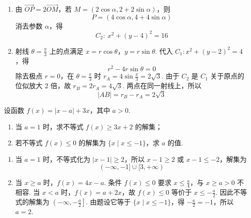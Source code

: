 \begin{solution}
\begin{enumerate}
\item 由 \(\overrightarrow{OP}=2\overrightarrow{OM}\)，若 \(M=(2\cos\alpha,2+2\sin\alpha)\)，则
\[
P=(4\cos\alpha,4+4\sin\alpha)
\]
消去参数 \(\alpha\)，得
\[
C_2:\ x^2+(y-4)^2=16
\]
\item 射线 \(\theta=\frac{\pi}{3}\) 上的点满足 \(x=r\cos\theta\)，\(y=r\sin\theta\). 代入 \(C_1:x^2+(y-2)^2=4\)，得
\[
r^2-4r\sin\theta=0
\]
除去极点 \(r=0\)，在 \(\theta=\frac{\pi}{3}\) 时 \(r_A=4\sin\frac{\pi}{3}=2\sqrt{3}\). 由于 \(C_2\) 是 \(C_1\) 关于原点的位似放大 \(2\) 倍，故 \(r_B=2r_A=4\sqrt{3}\). 两点在同一射线上，所以
\[
|AB|=r_B-r_A=2\sqrt{3}
\]
\end{enumerate}
\end{solution}

\begin{problem}
设函数 \( f(x) = |x - a| + 3x \)，其中 \( a > 0 \).
\begin{enumerate}
\item 当 \(a = 1\) 时，求不等式 \(f(x) \geqslant 3x + 2\) 的解集；
\item 若不等式 \( f(x) \leqslant 0 \) 的解集为 \( \{x \mid x \leqslant -1\} \)，求 \( a \) 的值.
\end{enumerate}
\end{problem}

\begin{solution}
\begin{enumerate}
\item 当 \(a=1\) 时，不等式化为 \(|x-1|\geqslant2\)，所以 \(x-1\geqslant2\) 或 \(x-1\leqslant-2\)，解集为
\[
(-\infty,-1]\cup[3,+\infty)
\]
\item 当 \(x\geqslant a\) 时，\(f(x)=4x-a\). 条件 \(f(x)\leqslant0\) 要求 \(x\leqslant\frac{a}{4}\)，与 \(x\geqslant a>0\) 不相容. 当 \(x<a\) 时，\(f(x)=a+2x\)，故 \(f(x)\leqslant0\) 等价于 \(x\leqslant-\frac{a}{2}\). 因此不等式的解集为 \(\left(-\infty,-\frac{a}{2}\right]\). 由题设它等于 \(\{x\mid x\leqslant-1\}\)，得 \(-\frac{a}{2}=-1\)，所以 \(a=2\).
\end{enumerate}
\end{solution}
